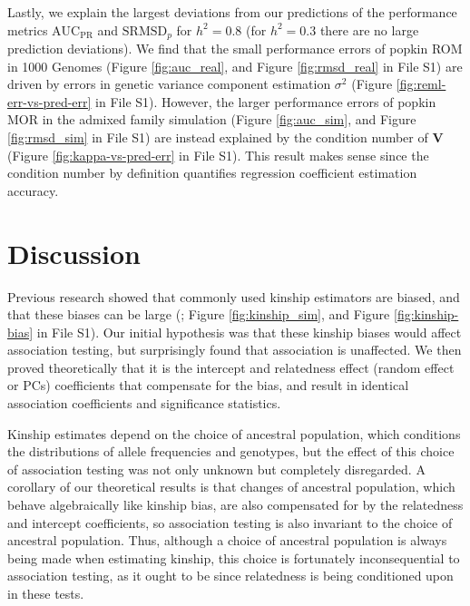 \documentclass[9pt,twocolumn,twoside]{gsajnl}
\newcommand{\rmsd}{\text{SRMSD}_p}
\newcommand{\auc}{\text{AUC}_\text{PR}}
\begin{document}
Lastly, we explain the largest deviations from our predictions of the performance metrics $\auc$ and $\rmsd$ for $h^2=0.8$ (for $h^2=0.3$ there are no large prediction deviations).
We find that the small performance errors of popkin ROM in 1000 Genomes (Figure \ref{fig:auc_real}, and Figure \ref*{fig:rmsd_real} in File S1) are driven by errors in genetic variance component estimation $\sigma^2$ (Figure \ref*{fig:reml-err-vs-pred-err} in File S1).
However, the larger performance errors of popkin MOR in the admixed family simulation (Figure \ref{fig:auc_sim}, and Figure \ref*{fig:rmsd_sim} in File S1) are instead explained by the condition number of $\mathbf{V}$ (Figure \ref*{fig:kappa-vs-pred-err} in File S1).
This result makes sense since the condition number by definition quantifies regression coefficient estimation accuracy.

\section{Discussion}

Previous research showed that commonly used kinship estimators are biased, and that these biases can be large (\citet{ochoa_estimating_2021}; Figure \ref{fig:kinship_sim}, and Figure \ref*{fig:kinship-bias} in File S1).
Our initial hypothesis was that these kinship biases would affect association testing, but surprisingly found that association is unaffected.
We then proved theoretically that it is the intercept and relatedness effect (random effect or PCs) coefficients that compensate for the bias, and result in identical association coefficients and significance statistics.

Kinship estimates depend on the choice of ancestral population, which conditions the distributions of allele frequencies and genotypes, but the effect of this choice of association testing was not only unknown but completely disregarded.
A corollary of our theoretical results is that changes of ancestral population, which behave algebraically like kinship bias, are also compensated for by the relatedness and intercept coefficients, so association testing is also invariant to the choice of ancestral population.
Thus, although a choice of ancestral population is always being made when estimating kinship, this choice is fortunately inconsequential to association testing, as it ought to be since relatedness is being conditioned upon in these tests.
\end{document}
